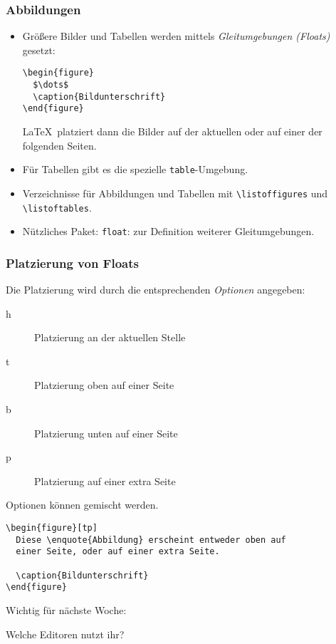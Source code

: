 \begin{frame}[fragile]
  \frametitle{Abbildungen}

  \begin{itemize}
  \item<+-> Größere Bilder und Tabellen werden mittels \emph{Gleitumgebungen (Floats)} gesetzt:
  \onslide<+->
\begin{lstlisting}
\begin{figure}
  $\dots$
  \caption{Bildunterschrift}
\end{figure}
\end{lstlisting}
  \onslide<+->
  \LaTeX\ platziert dann die Bilder auf der aktuellen oder auf einer der folgenden Seiten.

  \item<+-> Für Tabellen gibt es die spezielle \texttt{table}-Umgebung.
  \item<+-> Verzeichnisse für Abbildungen und Tabellen mit \lstinline!\listoffigures! und
    \lstinline!\listoftables!.
  \item<+-> Nützliches Paket: \lstinline!float!: zur Definition weiterer Gleitumgebungen.
  \end{itemize}

\end{frame}

\begin{frame}[fragile]
  \frametitle{Platzierung von Floats}

  \onslide<+->

  Die Platzierung wird durch die entsprechenden \textit{Optionen} angegeben:

  \onslide<+->

  \begin{description}
  \item[h] Platzierung an der aktuellen Stelle
  \item[t] Platzierung oben auf einer Seite
  \item[b] Platzierung unten auf einer Seite
  \item[p] Platzierung auf einer extra Seite
  \end{description}

  \onslide<+->

  Optionen können gemischt werden.

  \onslide<+->

\begin{lstlisting}
\begin{figure}[tp]
  Diese \enquote{Abbildung} erscheint entweder oben auf
  einer Seite, oder auf einer extra Seite.

  \caption{Bildunterschrift}
\end{figure}
\end{lstlisting}

\end{frame}

\begin{frame}
  \begin{center}
    Wichtig für nächste Woche:

    Welche Editoren nutzt ihr?
  \end{center}
\end{frame}


